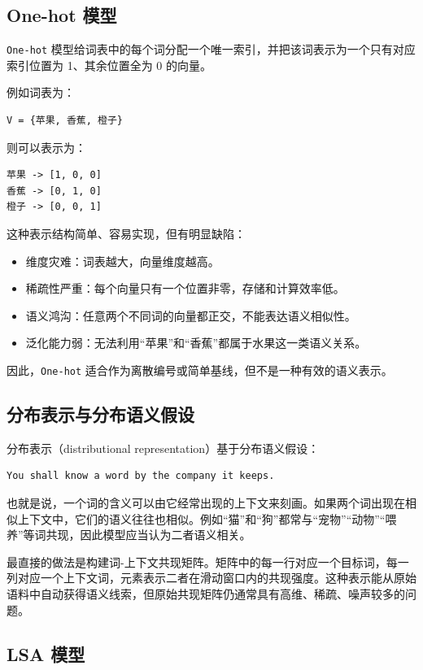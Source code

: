 \subsection{One-hot 模型}

\texttt{One-hot} 模型给词表中的每个词分配一个唯一索引，并把该词表示为一个只有对应索引位置为 1、其余位置全为 0 的向量。

例如词表为：
\begin{Verbatim}[breaklines=true]
V = {苹果, 香蕉, 橙子}
\end{Verbatim}

则可以表示为：
\begin{Verbatim}[breaklines=true]
苹果 -> [1, 0, 0]
香蕉 -> [0, 1, 0]
橙子 -> [0, 0, 1]
\end{Verbatim}

这种表示结构简单、容易实现，但有明显缺陷：
\begin{itemize}
  \item 维度灾难：词表越大，向量维度越高。
  \item 稀疏性严重：每个向量只有一个位置非零，存储和计算效率低。
  \item 语义鸿沟：任意两个不同词的向量都正交，不能表达语义相似性。
  \item 泛化能力弱：无法利用“苹果”和“香蕉”都属于水果这一类语义关系。
\end{itemize}

因此，\texttt{One-hot} 适合作为离散编号或简单基线，但不是一种有效的语义表示。

\subsection{分布表示与分布语义假设}

分布表示（distributional representation）基于分布语义假设：
\begin{Verbatim}[breaklines=true]
You shall know a word by the company it keeps.
\end{Verbatim}

也就是说，一个词的含义可以由它经常出现的上下文来刻画。如果两个词出现在相似上下文中，它们的语义往往也相似。例如“猫”和“狗”都常与“宠物”“动物”“喂养”等词共现，因此模型应当认为二者语义相关。

最直接的做法是构建词-上下文共现矩阵。矩阵中的每一行对应一个目标词，每一列对应一个上下文词，元素表示二者在滑动窗口内的共现强度。这种表示能从原始语料中自动获得语义线索，但原始共现矩阵仍通常具有高维、稀疏、噪声较多的问题。

\subsection{LSA 模型}

